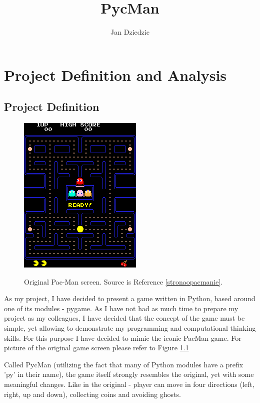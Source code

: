 \documentclass[11pt,a4paper,notitlepage]{report}
\author{Jan Dziedzic}
\title{PycMan}
\newenvironment{img}{
	\begin{center}
		\begin{figure}[H]
			\begin{center}
			
}{
	\end{center}
		\end{figure}
			\end{center}
}
\begin{document}
	\thispagestyle{plain}
	\maketitle
	
	\newpage
	\thispagestyle{empty}
	\newpage
	\thispagestyle{empty}
	\tableofcontents
	\chapter{Project Definition and Analysis}
		\newpage
		\section{Project Definition}
		
			\begin{img}
			\includegraphics{images/1_1}\\
			\caption{Original Pac-Man screen. Source is Reference \ref{stronaopacmanie}.}
			\label{oryg_pacman}
			\end{img}
		
			As my project, I have decided to present a game written in Python, based around one of its modules - pygame. As I have not had as much time to prepare my project as my colleagues, I have decided that the concept of the game must be simple, yet allowing to demonstrate my programming and computational thinking skills. For this purpose I have decided to mimic the iconic PacMan game.
			For picture of the original game screen please refer to Figure \ref{oryg_pacman}
			
			
		
			Called PycMan (utilizing the fact that many of Python modules have a prefix 'py' in their name), the game itself strongly resembles the original, yet with some meaningful changes. Like in the original - player can move in four directions (left, right, up and down), collecting coins and avoiding ghosts.
			
\end{document}
